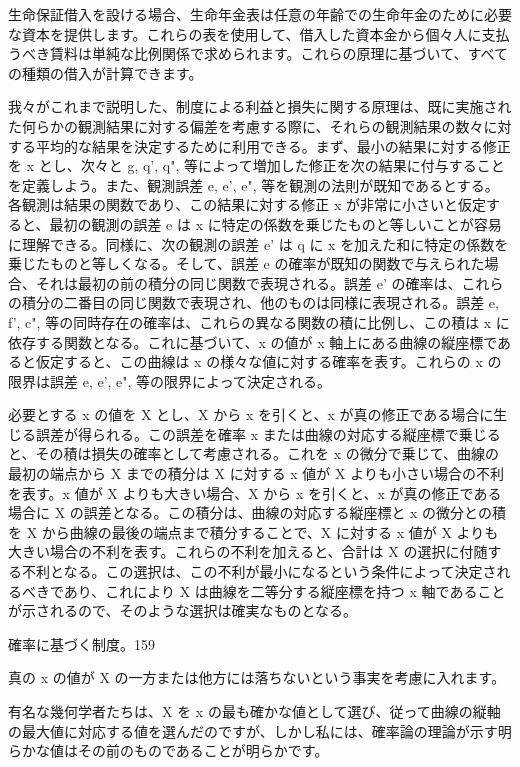\documentclass[a4paper,11pt,openany]{ltjsbook}
\begin{document}
生命保証借入を設ける場合、生命年金表は任意の年齢での生命年金のために必要な資本を提供します。これらの表を使用して、借入した資本金から個々人に支払うべき賃料は単純な比例関係で求められます。これらの原理に基づいて、すべての種類の借入が計算できます。

我々がこれまで説明した、制度による利益と損失に関する原理は、既に実施された何らかの観測結果に対する偏差を考慮する際に、それらの観測結果の数々に対する平均的な結果を決定するために利用できる。まず、最小の結果に対する修正を x とし、次々と g, q', q", 等によって増加した修正を次の結果に付与することを定義しよう。また、観測誤差 e, e', e", 等を観測の法則が既知であるとする。各観測は結果の関数であり、この結果に対する修正 x が非常に小さいと仮定すると、最初の観測の誤差 e は x に特定の係数を乗じたものと等しいことが容易に理解できる。同様に、次の観測の誤差 e' は q に x を加えた和に特定の係数を乗じたものと等しくなる。そして、誤差 e の確率が既知の関数で与えられた場合、それは最初の前の積分の同じ関数で表現される。誤差 e' の確率は、これらの積分の二番目の同じ関数で表現され、他のものは同様に表現される。誤差 e, f', c", 等の同時存在の確率は、これらの異なる関数の積に比例し、この積は x に依存する関数となる。これに基づいて、x の値が x 軸上にある曲線の縦座標であると仮定すると、この曲線は x の様々な値に対する確率を表す。これらの x の限界は誤差 e, e', e", 等の限界によって決定される。

必要とする x の値を X とし、X から x を引くと、x が真の修正である場合に生じる誤差が得られる。この誤差を確率 x または曲線の対応する縦座標で乗じると、その積は損失の確率として考慮される。これを x の微分で乗じて、曲線の最初の端点から X までの積分は X に対する x 値が X よりも小さい場合の不利を表す。x 値が X よりも大きい場合、X から x を引くと、x が真の修正である場合に X の誤差となる。この積分は、曲線の対応する縦座標と x の微分との積を X から曲線の最後の端点まで積分することで、X に対する x 値が X よりも大きい場合の不利を表す。これらの不利を加えると、合計は X の選択に付随する不利となる。この選択は、この不利が最小になるという条件によって決定されるべきであり、これにより X は曲線を二等分する縦座標を持つ x 軸であることが示されるので、そのような選択は確実なものとなる。

確率に基づく制度。159

真の x の値が X の一方または他方には落ちないという事実を考慮に入れます。

有名な幾何学者たちは、X を x の最も確かな値として選び、従って曲線の縦軸の最大値に対応する値を選んだのですが、しかし私には、確率論の理論が示す明らかな値はその前のものであることが明らかです。
\end{document}
